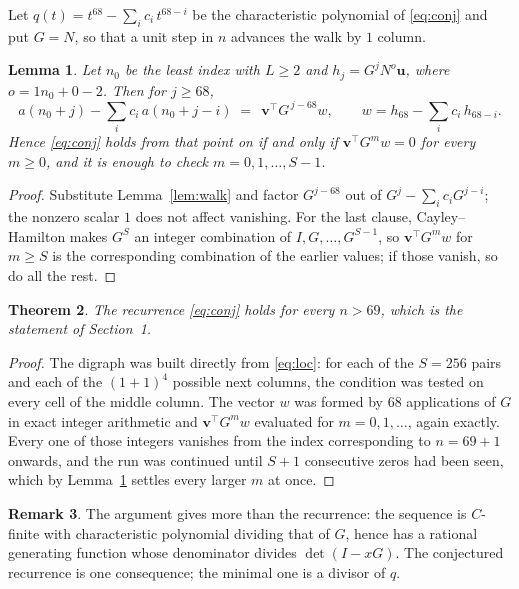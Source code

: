 \documentclass[11pt,a4paper]{article}
\theoremstyle{plain}
\newtheorem{theorem}{Theorem}
\newtheorem{lemma}[theorem]{Lemma}
\theoremstyle{definition}
\newtheorem{remark}[theorem]{Remark}
\begin{document}
Let $q(t)=t^{68}-\sum_i c_i\,t^{68-i}$ be the characteristic polynomial of
\eqref{eq:conj} and put $G=N$, so that a unit step in $n$ advances the walk by
$1$ column.

\begin{lemma}\label{lem:crit}
Let $n_0$ be the least index with $L\ge2$ and $h_j=G^{j}N^{o}\mathbf{u}$, where
$o=1n_0+0-2$. Then for $j\ge68$,
\[
a(n_0+j)-\sum_i c_i\,a(n_0+j-i)\;=\;\,\mathbf{v}^{\!\top}G^{\,j-68}w,
\qquad w=h_{68}-\sum_i c_i\,h_{68-i} .
\]
Hence \eqref{eq:conj} holds from that point on if and only if
$\mathbf{v}^{\!\top}G^{m}w=0$ for every $m\ge0$, and it is enough to check
$m=0,1,\dots,S-1$.
\end{lemma}

\begin{proof}
Substitute Lemma~\ref{lem:walk} and factor $G^{j-68}$ out of
$G^{j}-\sum_ic_iG^{j-i}$; the nonzero scalar $1$ does not affect
vanishing. For the last clause, Cayley--Hamilton makes $G^{S}$ an integer combination of
$I,G,\dots,G^{S-1}$, so $\mathbf{v}^{\!\top}G^{m}w$ for $m\ge S$ is the corresponding
combination of the earlier values; if those vanish, so do all the rest.
\end{proof}

\begin{theorem}
The recurrence \eqref{eq:conj} holds for every $n>69$, which is the statement of
Section~1.
\end{theorem}

\begin{proof}
The digraph was built directly from \eqref{eq:loc}: for each of the $S=256$ pairs and each
of the $(1+1)^{4}$ possible next columns, the condition was tested on every cell of
the middle column. The vector $w$ was formed by $68$ applications of $G$ in exact integer
arithmetic and $\mathbf{v}^{\!\top}G^{m}w$ evaluated for $m=0,1,\dots$, again exactly.
Every one of those integers vanishes from the index corresponding to $n=69+1$ onwards,
and the run was continued until $S+1$ consecutive zeros had been seen, which by
Lemma~\ref{lem:crit} settles every larger $m$ at once.
\end{proof}

\begin{remark}
The argument gives more than the recurrence: the sequence is $C$-finite with characteristic
polynomial dividing that of $G$, hence has a rational generating function whose denominator
divides $\det(I-xG)$. The conjectured recurrence is one consequence; the minimal one is a
divisor of $q$.
\end{remark}
\end{document}
